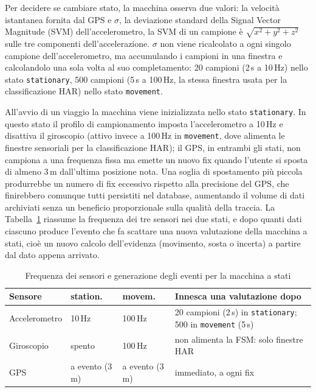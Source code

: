 \documentclass[conference]{IEEEtran}
\begin{document}
Per decidere se cambiare stato, la macchina osserva due valori: la
velocità istantanea fornita dal GPS e $\sigma$, la deviazione
standard della Signal Vector Magnitude (SVM) dell'accelerometro, 
la SVM di un campione è $\sqrt{x^2+y^2+z^2}$ sulle tre componenti
dell'accelerazione. $\sigma$ non viene ricalcolato a ogni singolo
campione dell'accelerometro, ma accumulando i campioni in una
finestra e calcolandolo una sola volta al suo completamento: 20
campioni (2\,s a 10\,Hz) nello stato \texttt{stationary}, 500
campioni (5\,s a 100\,Hz, la stessa finestra usata per la
classificazione HAR) nello stato \texttt{movement}.

All'avvio di un viaggio la macchina viene inizializzata nello stato
\texttt{stationary}. In questo stato il profilo di campionamento
imposta l'accelerometro a 10\,Hz e disattiva il giroscopio (attivo
invece a 100\,Hz in \texttt{movement}, dove alimenta le finestre
sensoriali per la classificazione HAR); il GPS, in entrambi gli stati,
non campiona a una frequenza fissa ma emette un nuovo fix quando
l'utente si sposta di almeno 3\,m dall'ultima posizione nota. Una
soglia di spostamento più piccola produrrebbe un numero di fix
eccessivo rispetto alla precisione del GPS, che finirebbero comunque
tutti persistiti nel database, aumentando il volume di dati archiviati
senza un beneficio proporzionale sulla qualità della traccia. La
Tabella~\ref{tab:sensor-events} riassume la frequenza dei tre sensori
nei due stati, e dopo quanti dati ciascuno produce l'evento che fa
scattare una nuova valutazione della macchina a stati, cioè un nuovo
calcolo dell'evidenza (movimento, sosta o incerta) a partire dal dato
appena arrivato.

\begin{table}[htbp]
\caption{Frequenza dei sensori e generazione degli eventi per la
macchina a stati}
\centering
\scriptsize
\begin{tabular}{|l|p{1.1cm}|p{1.1cm}|p{2.6cm}|}
\hline
\textbf{Sensore} & \textbf{station.} & \textbf{movem.} & \textbf{Innesca una valutazione dopo} \\
\hline
Accelerometro & 10\,Hz & 100\,Hz & 20 campioni (2\,s) in \texttt{stationary}; 500 in \texttt{movement} (5\,s) \\
\hline
Giroscopio & spento & 100\,Hz & non alimenta la FSM: solo finestre HAR \\
\hline
GPS & a evento (3\,m) & a evento (3\,m) & immediato, a ogni fix \\
\hline
\end{tabular}
\label{tab:sensor-events}
\end{table}
\end{document}

